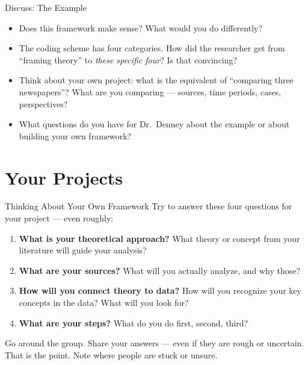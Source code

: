 \documentclass[aspectratio=169,11pt]{beamer}
\begin{document}
\begin{frame}{Discuss: The Example}
    \vspace{0.3cm}
    \begin{itemize}
        \item Does this framework make sense? What would you do differently?
        \vspace{0.3cm}
        \item The coding scheme has four categories. How did the researcher get from ``framing theory'' to \textit{these specific four}? Is that convincing?
        \vspace{0.3cm}
        \item Think about your own project: what is the equivalent of ``comparing three newspapers''? What are you comparing --- sources, time periods, cases, perspectives?
        \vspace{0.3cm}
        \item What questions do you have for Dr.\ Denney about the example or about building your own framework?
    \end{itemize}
\end{frame}

\section{Your Projects}

\begin{frame}{Thinking About Your Own Framework}
    Try to answer these four questions for your project --- even roughly:
    \vspace{0.3cm}
    \begin{enumerate}
        \item \textbf{What is your theoretical approach?} What theory or concept from your literature will guide your analysis?
        \vspace{0.2cm}
        \item \textbf{What are your sources?} What will you actually analyze, and why those?
        \vspace{0.2cm}
        \item \textbf{How will you connect theory to data?} How will you recognize your key concepts in the data? What will you look for?
        \vspace{0.2cm}
        \item \textbf{What are your steps?} What do you do first, second, third?
    \end{enumerate}
    \vspace{0.3cm}
    Go around the group. Share your answers --- even if they are rough or uncertain. That is the point. Note where people are stuck or unsure.
\end{frame}
\end{document}
